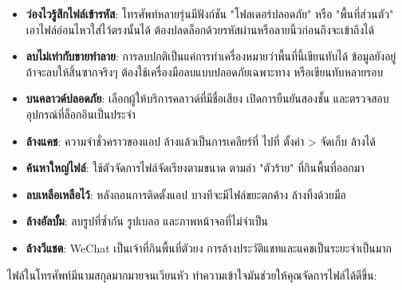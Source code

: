
\begin{itemize}
  \item \textbf{ว่องไวรู้สึกไฟล์เข้ารหัส}: โทรศัพท์หลายรุ่นมีฟังก์ชัน "โฟลเดอร์ปลอดภัย" หรือ "พื้นที่ส่วนตัว" เอาไฟล์อ่อนไหวใส่ไว้ตรงนั้นได้ ต้องปลดล็อกด้วยรหัสผ่านหรือลายนิ้วก่อนถึงจะเข้าถึงได้
  \item \textbf{ลบไม่เท่ากับขายทำลาย}: การลบปกติเป็นแค่การทำเครื่องหมายว่าพื้นที่นี้เขียนทับได้ ข้อมูลยังอยู่ ถ้าจะลบให้สิ้นซากจริงๆ ต้องใช้เครื่องมือลบแบบปลอดภัยเฉพาะทาง หรือเขียนทับหลายรอบ
  \item \textbf{บนคลาวด์ปลอดภัย}: เลือกผู้ให้บริการคลาวด์ที่มีชื่อเสียง เปิดการยืนยันสองชั้น และตรวจสอบอุปกรณ์ที่ล็อกอินเป็นประจำ
\end{itemize}


\begin{itemize}
  \item \textbf{ล้างแคช}: ความจำชั่วคราวของแอป ล้างแล้วเป็นการเคลียร์ที่ ไปที่ ตั้งค่า > จัดเก็บ ล้างได้
  \item \textbf{ค้นหาใหญ่ไฟล์}: ใช้ตัวจัดการไฟล์จัดเรียงตามขนาด ตามล่า "ตัวร้าย" ที่กินพื้นที่ออกมา
  \item \textbf{ลบเหลือเหลือไว้}: หลังถอนการติดตั้งแอป บางทีจะมีไฟล์ขยะตกค้าง ล้างทิ้งด้วยมือ
  \item \textbf{ล้างอัลบั้ม}: ลบรูปที่ซ้ำกัน รูปเบลอ และภาพหน้าจอที่ไม่จำเป็น
  \item \textbf{ล้างวีแชต}: WeChat เป็นเจ้าที่กินพื้นที่ตัวยง การล้างประวัติแชทและแคชเป็นระยะจำเป็นมาก
\end{itemize}


ไฟล์ในโทรศัพท์มีนามสกุลมากมายจนเวียนหัว ทำความเข้าใจมันช่วยให้คุณจัดการไฟล์ได้ดีขึ้น:

